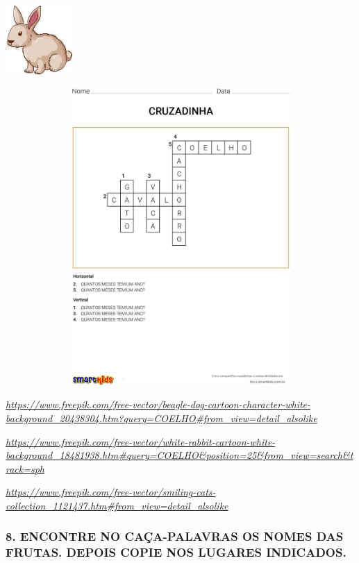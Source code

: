 \includegraphics[width=0.99722in,height=1.03125in]{media/image95.jpg}

\includegraphics[width=5.90556in,height=4.47101in]{media/image96.jpg}

\href{https://www.freepik.com/free-vector/beagle-dog-cartoon-character-white-background_20438304.htm?query=COELHO\#from_view=detail_alsolike}{\emph{https://www.freepik.com/free-vector/beagle-dog-cartoon-character-white-background\_20438304.htm?query=COELHO\#from\_view=detail\_alsolike}}

\href{https://www.freepik.com/free-vector/white-rabbit-cartoon-white-background_18481938.htm\#query=COELHO\&position=25\&from_view=search\&track=sph}{\emph{https://www.freepik.com/free-vector/white-rabbit-cartoon-white-background\_18481938.htm\#query=COELHO\&position=25\&from\_view=search\&track=sph}}

\href{https://www.freepik.com/free-vector/smiling-cats-collection_1121437.htm\#from_view=detail_alsolike}{\emph{https://www.freepik.com/free-vector/smiling-cats-collection\_1121437.htm\#from\_view=detail\_alsolike}}

\subsubsection{8. ENCONTRE NO CAÇA-PALAVRAS OS NOMES DAS FRUTAS. DEPOIS
COPIE NOS LUGARES
INDICADOS.}\label{encontre-no-cauxe7a-palavras-os-nomes-das-frutas.-depois-copie-nos-lugares-indicados.}

